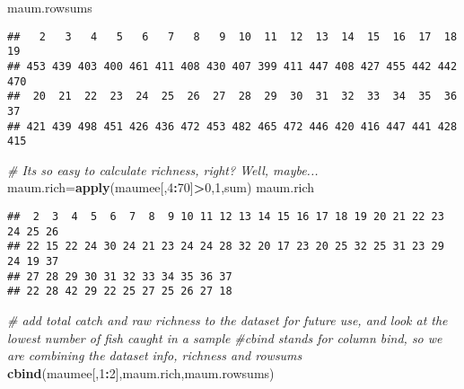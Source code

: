 \documentclass[]{article}
\newenvironment{Shaded}{\begin{snugshade}}{\end{snugshade}}
\newcommand{\KeywordTok}[1]{\textcolor[rgb]{0.13,0.29,0.53}{\textbf{#1}}}
\newcommand{\DecValTok}[1]{\textcolor[rgb]{0.00,0.00,0.81}{#1}}
\newcommand{\CommentTok}[1]{\textcolor[rgb]{0.56,0.35,0.01}{\textit{#1}}}
\newcommand{\OperatorTok}[1]{\textcolor[rgb]{0.81,0.36,0.00}{\textbf{#1}}}
\newcommand{\NormalTok}[1]{#1}
\begin{document}
\begin{Shaded}
\begin{Highlighting}[]
\NormalTok{maum.rowsums}
\end{Highlighting}
\end{Shaded}

\begin{verbatim}
##   2   3   4   5   6   7   8   9  10  11  12  13  14  15  16  17  18  19 
## 453 439 403 400 461 411 408 430 407 399 411 447 408 427 455 442 442 470 
##  20  21  22  23  24  25  26  27  28  29  30  31  32  33  34  35  36  37 
## 421 439 498 451 426 436 472 453 482 465 472 446 420 416 447 441 428 415
\end{verbatim}

\begin{Shaded}
\begin{Highlighting}[]
\CommentTok{# Its so easy to calculate richness, right?  Well, maybe...}
\NormalTok{maum.rich=}\KeywordTok{apply}\NormalTok{(maumee[,}\DecValTok{4}\OperatorTok{:}\DecValTok{70}\NormalTok{]}\OperatorTok{>}\DecValTok{0}\NormalTok{,}\DecValTok{1}\NormalTok{,sum)}
\NormalTok{maum.rich}
\end{Highlighting}
\end{Shaded}

\begin{verbatim}
##  2  3  4  5  6  7  8  9 10 11 12 13 14 15 16 17 18 19 20 21 22 23 24 25 26 
## 22 15 22 24 30 24 21 23 24 24 28 32 20 17 23 20 25 32 25 31 23 29 24 19 37 
## 27 28 29 30 31 32 33 34 35 36 37 
## 22 28 42 29 22 25 27 25 26 27 18
\end{verbatim}

\begin{Shaded}
\begin{Highlighting}[]
\CommentTok{# add total catch and raw richness to the dataset for future use, and look at the lowest number of fish caught in a sample}
\CommentTok{#cbind stands for column bind, so we are combining the dataset info, richness and rowsums}
\KeywordTok{cbind}\NormalTok{(maumee[,}\DecValTok{1}\OperatorTok{:}\DecValTok{2}\NormalTok{],maum.rich,maum.rowsums)}
\end{Highlighting}
\end{Shaded}
\end{document}
